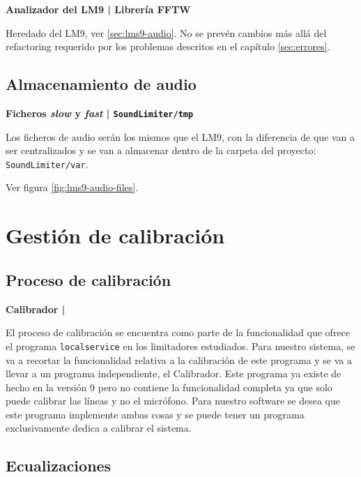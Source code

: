 \begin{flushright}
\textbf{Analizador del \acrshort{LM9} | Librería \acrshort{FFTW}}
\end{flushright}

Heredado del \acrshort{LM9}, ver \ref{sec:lms9-audio}. No se prevén cambios más allá del refactoring requerido por los problemas descritos en el capítulo \ref{sec:errores}.

\subsection{Almacenamiento de audio}

\begin{flushright}
\textbf{Ficheros \textit{slow} y \textit{fast} | \texttt{SoundLimiter/tmp}}
\end{flushright}

Los ficheros de audio serán los mismos que el \acrshort{LM9}, con la diferencia de que van a ser centralizados y se van a almacenar dentro de la carpeta del proyecto: \texttt{SoundLimiter/var}.

Ver figura \ref{fig:lms9-audio-files}.

\section{Gestión de calibración}

\subsection{Proceso de calibración}

\begin{flushright}
\textbf{Calibrador | }
\end{flushright}

El proceso de calibración se encuentra como parte de la funcionalidad que ofrece el programa \texttt{localservice} en los limitadores estudiados. Para nuestro sistema, se va a recortar la funcionalidad relativa a la calibración de este programa y se va a llevar a un programa independiente, el Calibrador. Este programa ya existe de hecho en la versión 9 pero no contiene la funcionalidad completa ya que solo puede calibrar las líneas y no el micrófono. Para nuestro software se desea que este programa implemente ambas cosas y se puede tener un programa exclusivamente dedica a calibrar el sistema.

\subsection{Ecualizaciones}

